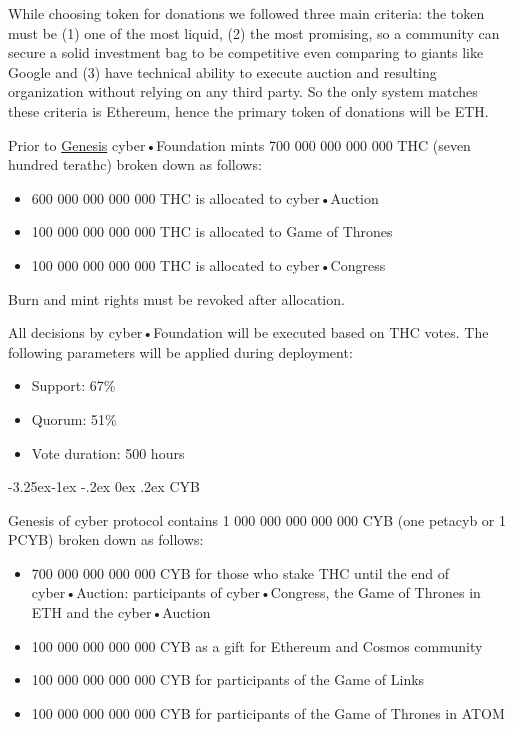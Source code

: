 \documentclass[8pt,oneside]{amsart}
\makeatletter
\renewcommand\subsection{\@startsection{subsection}{2}{\z@}%
                                     {-3.25ex\@plus -1ex \@minus -.2ex}%
                                     {0ex \@plus .2ex}%
                                     {\play\Large}}%
\newcommand{\titleSection}[1]{\subsection{#1}}
\newcommand{\code}[1]{{\PlayBold #1}}
\newenvironment{Figure}
  {\par\medskip\noindent\minipage{\linewidth}}
  {\endminipage\par\medskip}
\makeatother
\begin{document}
\begin{Abstract}
While choosing token for donations we followed three main criteria: the token must be (1) one of the most liquid, (2) the most promising, so a community can secure a solid investment bag to be competitive even comparing to giants like Google and (3) have technical ability to execute auction and resulting organization without relying on any third party. So the only system matches these criteria is Ethereum, hence the primary token of donations will be ETH.

Prior to \hyperlink{genesis}{Genesis} cyber•Foundation mints 700 000 000 000 000 THC (seven hundred terathc) broken down as follows:

\begin{itemize}
\item 600 000 000 000 000 THC is allocated to cyber•Auction
\item 100 000 000 000 000 THC is allocated to Game of Thrones
\item 100 000 000 000 000 THC is allocated to cyber•Congress
\end{itemize}

\begin{Figure}
 \centering
 
\end{Figure}

Burn and mint rights must be revoked after allocation.

All decisions by cyber•Foundation will be executed based on THC votes. The following parameters will be applied during deployment:

\begin{itemize}
\item Support: 67\%
\item Quorum: 51\%
\item Vote duration: 500 hours
\end{itemize}

\titleSection{CYB}\label{cyb}

Genesis of \code{cyber} protocol contains 1 000 000 000 000 000 CYB (one petacyb or 1 PCYB) broken down as follows:

\begin{itemize}
\item 700 000 000 000 000 CYB for those who stake THC until the end of cyber•Auction: participants of cyber•Congress, the Game of Thrones in ETH and the cyber•Auction
\item 100 000 000 000 000 CYB as a gift for Ethereum and Cosmos community
\item 100 000 000 000 000 CYB for participants of the Game of Links
\item 100 000 000 000 000 CYB for participants of the Game of Thrones in ATOM


\end{itemize}
\end{Abstract}
\end{document}
